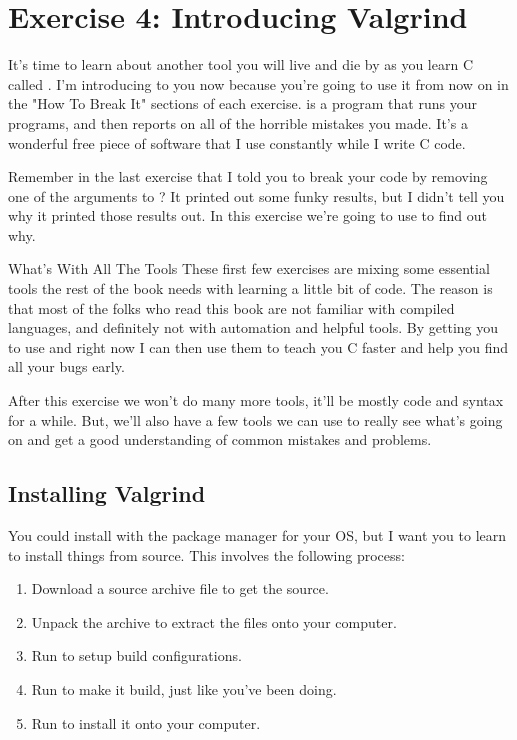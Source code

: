 \chapter{Exercise 4: Introducing Valgrind}

It's time to learn about another tool you will live and die by as you
learn C called .  I'm introducing  to you
now because you're going to use it from now on in the "How To Break It"
sections of each exercise.   is a program that runs your programs,
and then reports on all of the horrible mistakes you made.  It's a wonderful
free piece of software that I use constantly while I write C code.

Remember in the last exercise that I told you to break your code by
removing one of the arguments to ?  It printed out some
funky results, but I didn't tell you why it printed those results out.
In this exercise we're going to use  to find out 
why.

\begin{aside}{What's With All The Tools}
These first few exercises are mixing some essential tools the rest
of the book needs with learning a little bit of code.  The reason is
that most of the folks who read this book are not familiar with compiled
languages, and definitely not with automation and helpful tools.  By 
getting you to use  and  right now I can
then use them to teach you C faster and help you find all your bugs
early.

After this exercise we won't do many more tools, it'll be mostly
code and syntax for a while.  But, we'll also have a few tools we
can use to really see what's going on and get a good understanding
of common mistakes and problems.
\end{aside}

\section{Installing Valgrind}

You could install  with the package manager for your
OS, but I want you to learn to install things from source.  This involves
the following process:

\begin{enumerate}
\item Download a source archive file to get the source.
\item Unpack the archive to extract the files onto your computer.
\item Run  to setup build configurations.
\item Run  to make it build, just like you've been doing.
\item Run  to install it onto your computer.
\end{enumerate}

